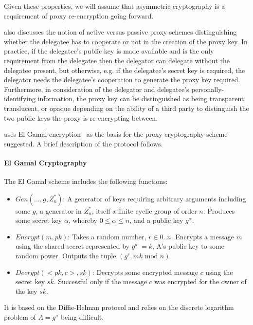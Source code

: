 Given these properties, we will assume that asymmetric cryptography is a requirement of proxy re-encryption going forward.

\cite{bbs:1998:book} also discusses the notion of active versus passive proxy schemes distinguishing whether the delegatee has to cooperate or not in the creation of the proxy key. In practice, if the delegatee's public key is made available and is the only requirement from the delegatee then the delegator can delegate without the delegatee present, but otherwise, e.g. if the delegatee's secret key is required, the delegator needs the delegatee's cooperation to generate the proxy key required. Furthermore, in consideration of the delegator and delegatee's personally-identifying information, the proxy key can be distinguished as being transparent, translucent, or opaque depending on the ability of a third party to distinguish the two public keys the proxy is re-encrypting between.

\cite{bbs:1998:book} uses El Gamal encryption~\cite{elgamal:1985:article} as the basis for the proxy cryptography scheme suggested. A brief description of the protocol follows.

\paragraph{El Gamal Cryptography}

The El Gamal scheme includes the following functions:

\begin{itemize}
  \item $Gen(..., g, Z_n^*)$: A generator of keys requiring arbitrary arguments including some $g$, a generator in $Z_n^*$, itself a finite cyclic group of order $n$. Produces some secret key $\alpha$, whereby $0 \le \alpha \le n$, and a public key $g^\alpha$.
  \item $Encrypt(m, pk)$: Takes a random number, $r \in {0..n}$. Encrypts a message $m$ using the shared secret represented by $g^a^r = k$, A's public key to some random power. Outputs the tuple $(g^r, mk \text{ mod } n)$.
  \item $Decrypt(<pk, c>, sk)$: Decrypts some encrypted message $c$ using the secret key $sk$. Successful only if the message $c$ was encrypted for the owner of the key $sk$.
\end{itemize}

It is based on the Diffie-Helman protocol and relies on the discrete logarithm problem of $A = g^a$ being difficult.

